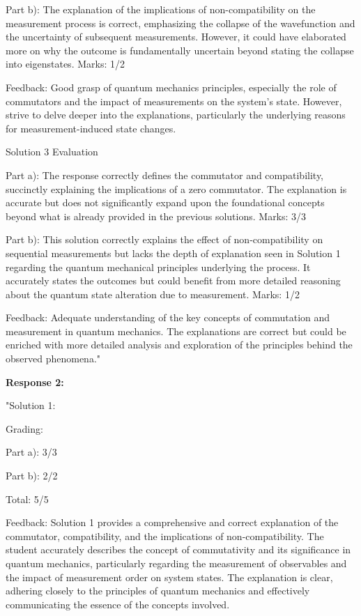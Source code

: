 \documentclass[a4paper,11pt]{article}
\begin{document}
Part b): The explanation of the implications of non-compatibility on the measurement process is correct, emphasizing the collapse of the wavefunction and the uncertainty of subsequent measurements. However, it could have elaborated more on why the outcome is fundamentally uncertain beyond stating the collapse into eigenstates. Marks: 1/2

Feedback: Good grasp of quantum mechanics principles, especially the role of commutators and the impact of measurements on the system's state. However, strive to delve deeper into the explanations, particularly the underlying reasons for measurement-induced state changes.

Solution 3 Evaluation

Part a): The response correctly defines the commutator and compatibility, succinctly explaining the implications of a zero commutator. The explanation is accurate but does not significantly expand upon the foundational concepts beyond what is already provided in the previous solutions. Marks: 3/3

Part b): This solution correctly explains the effect of non-compatibility on sequential measurements but lacks the depth of explanation seen in Solution 1 regarding the quantum mechanical principles underlying the process. It accurately states the outcomes but could benefit from more detailed reasoning about the quantum state alteration due to measurement. Marks: 1/2

Feedback: Adequate understanding of the key concepts of commutation and measurement in quantum mechanics. The explanations are correct but could be enriched with more detailed analysis and exploration of the principles behind the observed phenomena."

\textbf{Response 2:}

"Solution 1:

Grading:

Part a): 3/3

Part b): 2/2

Total: 5/5

Feedback:
Solution 1 provides a comprehensive and correct explanation of the commutator, compatibility, and the implications of non-compatibility. The student accurately describes the concept of commutativity and its significance in quantum mechanics, particularly regarding the measurement of observables and the impact of measurement order on system states. The explanation is clear, adhering closely to the principles of quantum mechanics and effectively communicating the essence of the concepts involved.
\end{document}

